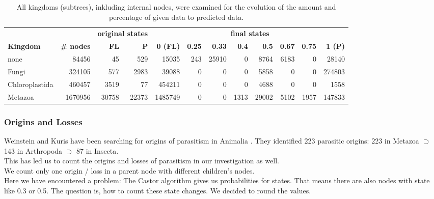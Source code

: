       \begin{table}[h!]
        \begin{center}
          \hspace*{-2cm}\begin{tabular}{ |l|r||r|r||r|r|r|r|r|r|r|r| }
            \hline
            & & \multicolumn{2}{c||}{\bfseries original states} & \multicolumn{8}{c|}{\bfseries final states} \\
            \bfseries Kingdom & \bfseries \# nodes & \bfseries FL & \bfseries P
              & \bfseries 0 (FL) & \bfseries 0.25 & \bfseries 0.33 & \bfseries 0.4 & \bfseries 0.5 & \bfseries 0.67 & \bfseries 0.75 & \bfseries 1 (P) \\
            \hline \hline
            none & 84456 & 45 & 529 
              & 15035 & 243 & 25910 & 0 & 8764 & 6183 & 0 & 28140 \\
            Fungi & 324105 & 577 & 2983
              & 39088 & 0 & 0 & 0 & 5858 & 0 & 0 & 274803 \\
            Chloroplastida & 460457 & 3519 & 77
              & 454211 & 0 & 0 & 0 & 4688 & 0 & 0 & 1558 \\
            Metazoa & 1670956 & 30758 & 22373
              & 1485749 & 0 & 0 & 1313 & 29002 & 5102 & 1957 & 147833 \\
            \hline  
          \end{tabular}
        \end{center}
        \caption{All kingdoms (subtrees), inkluding internal nodes, were examined for the evolution of the 
        amount and percentage of given data to predicted data.}
        \label{table:Kingdom internal nodes}
      \end{table}

      \subsubsection{Origins and Losses}

        Weinstein and Kuris have been searching for origins of parasitism in Animalia \cite{Weinstein2016}. 
          They identified 223 parasitic origins: 223 in Metazoa $\supset$ 143 in Arthropoda $\supset$ 87 
          in Insecta. \\
        This has led us to count the origins and losses of parasitism in our investigation as well. \\
        We count only one origin / loss in a parent node with different children's nodes. \\
        Here we have encountered a problem: The Castor algorithm gives us probabilities for states. That 
          means there are also nodes with state like 0.3 or 0.5. The question is, how to count these state 
          changes. We decided to round the values.

